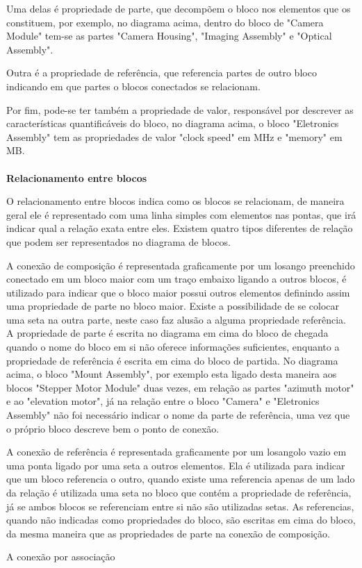 Uma delas é propriedade de parte, que decompõem o bloco nos elementos que os constituem, por exemplo, no diagrama acima, dentro do bloco de "Camera Module"  tem-se as partes "Camera Housing", "Imaging Assembly"  e "Optical Assembly".

Outra é a propriedade de referência, que referencia partes de outro bloco indicando em que partes o blocos conectados se relacionam. 

Por fim, pode-se ter também a propriedade de valor, responsável por descrever as características quantificáveis do bloco, no diagrama acima, o bloco "Eletronics Assembly"  tem as propriedades de valor "clock speed"  em MHz e "memory"  em MB.

\paragraph{}
 \textbf{Relacionamento entre blocos} 
 
O relacionamento entre blocos indica como os blocos se relacionam, de maneira geral ele é representado com uma linha simples com elementos nas pontas, que irá indicar qual a relação exata entre eles. Existem quatro tipos diferentes de relação que podem ser representados no diagrama de blocos.

A conexão de composição é representada graficamente por um losango preenchido conectado em um bloco maior com um traço embaixo ligando a outros blocos, é utilizado para indicar que o bloco maior possui outros elementos definindo assim uma propriedade de parte no bloco maior. Existe a possibilidade de se colocar uma seta na outra parte, neste caso faz alusão a alguma propriedade referência. A propriedade de parte é escrita no diagrama em cima do bloco de chegada quando o nome do bloco em si não oferece informações suficientes, enquanto a propriedade de referência é escrita em cima do bloco de partida. No diagrama acima, o bloco "Mount Assembly", por exemplo esta ligado desta maneira aos blocos "Stepper Motor Module" duas vezes, em relação as partes "azimuth motor" e ao "elevation motor", já na relação entre o bloco "Camera" e "Eletronics Assembly" não foi necessário indicar o nome da parte de referência, uma vez que o próprio bloco descreve bem o ponto de conexão.

A conexão de referência é representada graficamente por um losangolo vazio em uma ponta ligado por uma seta a outros elementos. Ela é utilizada para indicar que um bloco referencia o outro, quando existe uma referencia apenas de um lado da relação é utilizada uma seta no bloco que contém a propriedade de referência, já se ambos blocos se referenciam entre si não são utilizadas setas. As referencias, quando não indicadas como propriedades do bloco, são escritas em cima do bloco, da mesma maneira que as propriedades de parte na conexão de composição. 

A conexão por associação 